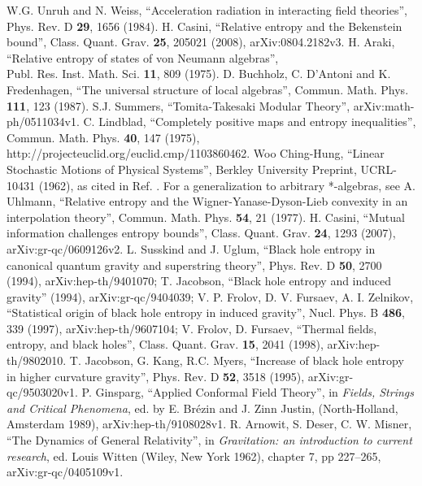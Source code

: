 \documentclass{article}
\begin{document}
\begin{thebibliography}{299}
W.G. Unruh and N. Weiss, ``Acceleration radiation in interacting field theories'', Phys. Rev. D \textbf{29}, 1656 (1984).
H. Casini, ``Relative entropy and the Bekenstein bound'', Class. Quant. Grav. \textbf{25}, 205021 (2008), arXiv:0804.2182v3.
H. Araki, ``Relative entropy of states of von Neumann algebras'', \\Publ. Res. Inst. Math. Sci. \textbf{11}, 809 (1975).  %
D. Buchholz, C. D'Antoni and K. Fredenhagen, ``The universal structure of local algebras'', Commun. Math. Phys. \textbf{111}, 123 (1987).
S.J. Summers, ``Tomita-Takesaki Modular Theory'', arXiv:math-ph/0511034v1.
C. Lindblad, ``Completely positive maps and entropy inequalities'', \\Commun. Math. Phys. \textbf{40}, 147 (1975), \\http://projecteuclid.org/euclid.cmp/1103860462.  Woo Ching-Hung, ``Linear Stochastic Motions of Physical Systems'', Berkley University Preprint, UCRL-10431 (1962), as cited in Ref. \cite{sorkin98}.  For a generalization to arbitrary *-algebras, see A. Uhlmann, ``Relative entropy and the Wigner-Yanase-Dyson-Lieb convexity in an interpolation theory'', Commun. Math. Phys. \textbf{54}, 21 (1977).
H. Casini, ``Mutual information challenges entropy bounds'', Class. Quant. Grav. \textbf{24}, 1293 (2007), arXiv:gr-qc/0609126v2.
L. Susskind and J. Uglum, ``Black hole entropy in canonical quantum gravity and superstring theory'', Phys. Rev. D \textbf{50}, 2700 (1994), arXiv:hep-th/9401070; T. Jacobson, ``Black hole entropy and induced gravity'' (1994), arXiv:gr-qc/9404039; V. P. Frolov, D. V. Fursaev, A. I. Zelnikov, ``Statistical origin of black hole entropy in induced gravity'', Nucl. Phys. B \textbf{486}, 339 (1997), arXiv:hep-th/9607104; V. Frolov, D. Fursaev, ``Thermal fields, entropy, and black holes'', Class. Quant. Grav. \textbf{15}, 2041 (1998), arXiv:hep-th/9802010.
T. Jacobson, G. Kang, R.C. Myers, ``Increase of black hole entropy in higher curvature gravity'', Phys. Rev. D \textbf{52}, 3518 (1995), arXiv:gr-qc/9503020v1.
P. Ginsparg, ``Applied Conformal Field Theory'', in \textit{Fields, Strings and Critical Phenomena}, ed. by E. Br\'ezin and J. Zinn Justin, (North-Holland, Amsterdam 1989), arXiv:hep-th/9108028v1.
R. Arnowit, S. Deser, C. W. Misner, ``The Dynamics of General Relativity'', in \textit{Gravitation: an introduction to current research}, ed. Louis Witten (Wiley, New York 1962), chapter 7, pp 227--265, arXiv:gr-qc/0405109v1.

\end{thebibliography}
\end{document}
